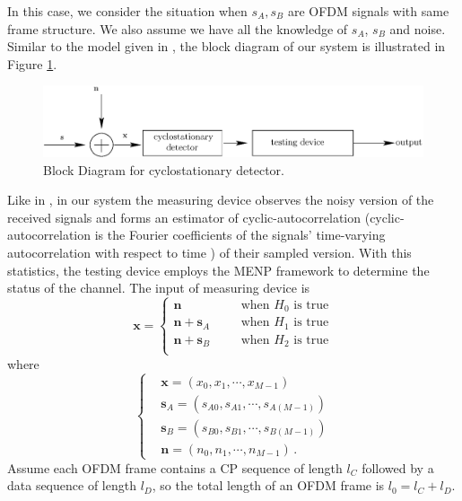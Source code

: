 In this case, we consider the situation when $s_A, s_B$ are OFDM signals with same frame structure.
We also assume we have all the knowledge of $s_A$, $s_B$ and noise.   
Similar to the model given in \cite{lunden2007spectrum, lunden2010robust}, the block diagram of our system is illustrated in Figure \ref{pic:1222a0}.
\begin{figure}[!t]
  \centering 
  \includegraphics[width=\textwidth]{4/fig1.eps}
  \caption{Block Diagram for  cyclostationary detector.}
  \label{pic:1222a0}
\end{figure}
Like in \cite{lunden2007spectrum, lunden2010robust}, in our system the measuring device observes the noisy version of the received signals and forms an estimator of cyclic-autocorrelation (cyclic-autocorrelation is the Fourier coefficients of the signals' time-varying autocorrelation with respect to time \cite{lunden2007spectrum, lunden2010robust, dandawate1994statistical}) of their sampled version. With this statistics, the testing device employs the MENP framework to determine the status of the channel. The input of measuring device is
\begin{equation}
  \mathbf{x} = \begin{cases}
	\mathbf{n}\;\;\;\;\;\;&\text{when $H_0$ is true}\\
	\mathbf{n}+\mathbf{s}_A\;\;\;\;\;\;&\text{when $H_1$ is true}\\
	\mathbf{n}+\mathbf{s}_B\;\;\;\;\;\;&\text{when $H_2$ is true}\\
  \end{cases}
  \label{equ:1209a1}
\end{equation}
where 
\begin{equation}
  \begin{cases}
	&\mathbf{x} = (x_0, x_1, \cdots, x_{M-1})\\
	&\mathbf{s}_A = (s_{A0}, s_{A1}, \cdots, s_{A(M-1)})\\
	&\mathbf{s}_B = (s_{B0}, s_{B1}, \cdots, s_{B(M-1)})\\
	&\mathbf{n} = (n_{0}, n_{1}, \cdots, n_{M-1})\,.
  \end{cases}
  \label{xssn}
\end{equation}
Assume each OFDM frame contains a CP sequence of length $l_C$ followed by a data sequence of length $l_D$, so the total length of an OFDM frame is $l_0 = l_C+l_D$. 
